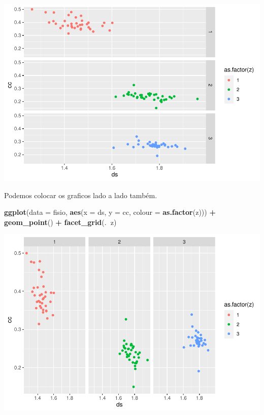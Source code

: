 \documentclass[
]{book}
\newenvironment{Shaded}{\begin{snugshade}}{\end{snugshade}}
\newcommand{\DataTypeTok}[1]{\textcolor[rgb]{0.13,0.29,0.53}{#1}}
\newcommand{\KeywordTok}[1]{\textcolor[rgb]{0.13,0.29,0.53}{\textbf{#1}}}
\newcommand{\NormalTok}[1]{#1}
\newcommand{\OperatorTok}[1]{\textcolor[rgb]{0.81,0.36,0.00}{\textbf{#1}}}
\newcommand{\StringTok}[1]{\textcolor[rgb]{0.31,0.60,0.02}{#1}}
\begin{document}
\includegraphics{TudodoR_files/figure-latex/unnamed-chunk-220-1.pdf}

Podemos colocar os graficos lado a lado também.

\begin{Shaded}
\begin{Highlighting}[]
\KeywordTok{ggplot}\NormalTok{(}\DataTypeTok{data =}\NormalTok{ fisio, }\KeywordTok{aes}\NormalTok{(}\DataTypeTok{x =}\NormalTok{ ds, }\DataTypeTok{y =}\NormalTok{ cc, }\DataTypeTok{colour =} \KeywordTok{as.factor}\NormalTok{(z))) }\OperatorTok{+}
\StringTok{  }\KeywordTok{geom_point}\NormalTok{() }\OperatorTok{+}
\StringTok{  }\KeywordTok{facet_grid}\NormalTok{(.}\OperatorTok{~}\NormalTok{z)}
\end{Highlighting}
\end{Shaded}

\includegraphics{TudodoR_files/figure-latex/unnamed-chunk-221-1.pdf}
\end{document}
